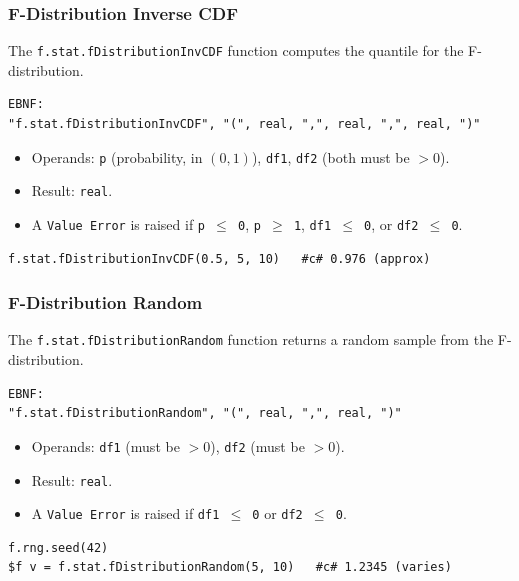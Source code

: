 \subsubsection{F-Distribution Inverse CDF}
The \texttt{f.stat.fDistributionInvCDF} function computes the quantile for the F-distribution.
\begin{verbatim}
EBNF:
"f.stat.fDistributionInvCDF", "(", real, ",", real, ",", real, ")"
\end{verbatim}
\begin{itemize}
\item Operands: \texttt{p} (probability, in $(0, 1)$), \texttt{df1}, \texttt{df2} (both must be $> 0$).
\item Result: \texttt{real}.
\item A \texttt{Value Error} is raised if \texttt{p $\leq$ 0}, \texttt{p $\geq$ 1}, \texttt{df1 $\leq$ 0}, or \texttt{df2 $\leq$ 0}.
\end{itemize}
\begin{verbatim}
f.stat.fDistributionInvCDF(0.5, 5, 10)   #c# 0.976 (approx)
\end{verbatim}

\subsubsection{F-Distribution Random}
The \texttt{f.stat.fDistributionRandom} function returns a random sample from the F-distribution.
\begin{verbatim}
EBNF:
"f.stat.fDistributionRandom", "(", real, ",", real, ")"
\end{verbatim}
\begin{itemize}
\item Operands: \texttt{df1} (must be $> 0$), \texttt{df2} (must be $> 0$).
\item Result: \texttt{real}.
\item A \texttt{Value Error} is raised if \texttt{df1 $\leq$ 0} or \texttt{df2 $\leq$ 0}.
\end{itemize}
\begin{verbatim}
f.rng.seed(42)
$f v = f.stat.fDistributionRandom(5, 10)   #c# 1.2345 (varies)
\end{verbatim}

